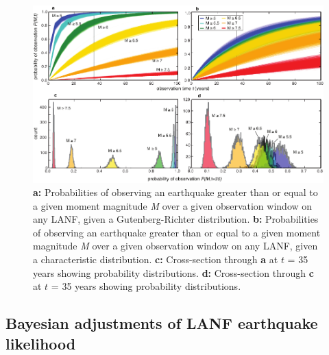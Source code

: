\documentclass[twocolumn,grl]{AGUTeX}
\begin{document}
\begin{article}
\begin{figure}%
\noindent\includegraphics[width=40pc]{./figures/all_probs_2x2.pdf}

\caption{\textbf{a:} Probabilities of observing an earthquake greater than or
equal to a given moment magnitude \emph{M} over a given observation window on
any LANF, given a Gutenberg-Richter distribution.  \textbf{b:} Probabilities of
observing an earthquake greater than or equal to a given moment magnitude
\emph{M} over a given observation window on any LANF, given a characteristic
distribution.  \textbf{c:} Cross-section through \textbf{a} at $t$ = 35 years
showing probability distributions.  \textbf{d:} Cross-section through
\textbf{c} at $t$ = 35 years showing probability distributions.}

\label{fig:all_probs}
\end{figure}

\subsection{Bayesian adjustments of LANF earthquake likelihood}


\end{article}
\end{document}
